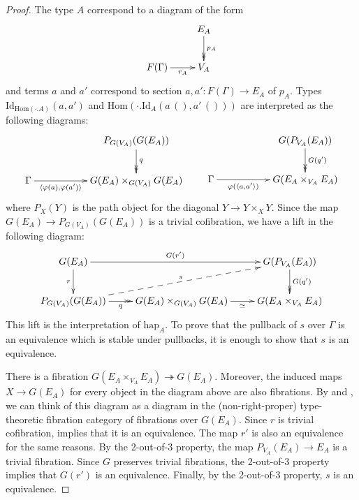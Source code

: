\documentclass[reqno]{amsart}
\theoremstyle{definition}
\theoremstyle{remark}
\newcommand{\fs}[1]{\mathrm{#1}}
\newcommand{\Hom}{\fs{Hom}}
\newcommand{\Id}{\fs{Id}}
\numberwithin{figure}{section}
\begin{document}
\begin{proof}
The type $A$ correspond to a diagram of the form
\[ \xymatrix{                           & E_A \ar@{->>}[d]^{p_A} \\
              F(\Gamma) \ar[r]_-{r_A}   & V_A
            } \]
and terms $a$ and $a'$ correspond to section $a,a' : F(\Gamma) \to E_A$ of $p_A$.
Types $\Id_{\Hom(\cdot . A)}(a,a')$ and $\Hom(\cdot . \Id_A(a\,(),a'\,()))$ are interpreted as the following diagrams:
\[ \xymatrix{                                                           & & P_{G(V_A)}(G(E_A)) \ar@{->>}[d]^q \\
              \Gamma \ar[rr]_-{\langle \varphi(a), \varphi(a') \rangle} & & G(E_A) \times_{G(V_A)} G(E_A)
            } \qquad
   \xymatrix{                                                   & & G(P_{V_A}(E_A)) \ar@{->>}[d]^{G(q')} \\
              \Gamma \ar[rr]_-{\varphi(\langle a, a' \rangle)}  & & G(E_A \times_{V_A} E_A)
            } \]
where $P_{X}(Y)$ is the path object for the diagonal $Y \to Y \times_{X} Y$.
Since the map $G(E_A) \to P_{G(V_A)}(G(E_A))$ is a trivial cofibration, we have a lift in the following diagram:
\[ \xymatrix{ G(E_A) \ar[d]_r \ar[rr]^-{G(r')}                      &                                               & G(P_{V_A}(E_A)) \ar@{->>}[d]^{G(q')} \\
              P_{G(V_A)}(G(E_A)) \ar@{->>}[r]_-q \ar@{-->}[urr]^s   & G(E_A) \times_{G(V_A)} G(E_A) \ar[r]_-\simeq  & G(E_A \times_{V_A} E_A)
            } \]
This lift is the interpretation of $\fs{hap}_A$.
To prove that the pullback of $s$ over $\Gamma$ is an equivalence which is stable under pullbacks, it is enough to show that $s$ is an equivalence.

There is a fibration $G(E_A \times_{V_A} E_A) \twoheadrightarrow G(E_A)$.
Moreover, the induced maps $X \to G(E_A)$ for every object in the diagram above are also fibrations.
By  and , we can think of this diagram as a diagram in the (non-right-proper) type-theoretic fibration category of fibrations over $G(E_A)$.
Since $r$ is trivial cofibration, \cite[Lemma~3.6]{shul-inv} implies that it is an equivalence.
The map $r'$ is also an equivalence for the same reasons.
By the 2-out-of-3 property, the map $P_{V_A}(E_A) \to E_A$ is a trivial fibration.
Since $G$ preserves trivial fibrations, the 2-out-of-3 property implies that $G(r')$ is an equivalence.
Finally, by the 2-out-of-3 property, $s$ is an equivalence.
\end{proof}
\end{document}
